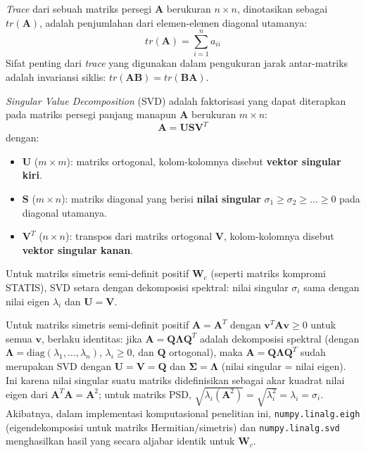 \begin{definition}
  \textit{Trace} dari sebuah matriks persegi $\mathbf{A}$ berukuran $n \times n$, dinotasikan sebagai $tr(\mathbf{A})$, adalah penjumlahan dari elemen-elemen diagonal utamanya:
  \begin{equation}
    tr(\mathbf{A}) = \sum_{i=1}^{n} a_{ii}
  \end{equation}
  Sifat penting dari \textit{trace} yang digunakan dalam pengukuran jarak antar-matriks adalah invariansi siklis: $tr(\mathbf{AB}) = tr(\mathbf{BA})$.
\end{definition}

\begin{definition}
  \textit{Singular Value Decomposition} (SVD) adalah faktorisasi yang dapat diterapkan pada matriks persegi panjang manapun $\mathbf{A}$ berukuran $m \times n$:
  \begin{equation}
    \mathbf{A} = \mathbf{U} \mathbf{S} \mathbf{V}^T
  \end{equation}
  dengan:
  \begin{itemize}
    \item $\mathbf{U}$ ($m \times m$): matriks ortogonal, kolom-kolomnya disebut \textbf{vektor singular kiri}.
    \item $\mathbf{S}$ ($m \times n$): matriks diagonal yang berisi \textbf{nilai singular} $\sigma_1 \ge \sigma_2 \ge \dots \ge 0$ pada diagonal utamanya.
    \item $\mathbf{V}^T$ ($n \times n$): transpos dari matriks ortogonal $\mathbf{V}$, kolom-kolomnya disebut \textbf{vektor singular kanan}.
  \end{itemize}
  Untuk matriks simetris semi-definit positif $\mathbf{W}_c$ (seperti matriks kompromi STATIS), SVD setara dengan dekomposisi spektral: nilai singular $\sigma_i$ sama dengan nilai eigen $\lambda_i$ dan $\mathbf{U} = \mathbf{V}$.
\end{definition}

\begin{remark}
  Untuk matriks simetris semi-definit positif $\mathbf{A} = \mathbf{A}^T$ dengan $\mathbf{v}^T\mathbf{A}\mathbf{v} \ge 0$ untuk semua $\mathbf{v}$, berlaku identitas: jika $\mathbf{A} = \mathbf{Q}\boldsymbol{\Lambda}\mathbf{Q}^T$ adalah dekomposisi spektral (dengan $\boldsymbol{\Lambda} = \mathrm{diag}(\lambda_1,\ldots,\lambda_n)$, $\lambda_i \ge 0$, dan $\mathbf{Q}$ ortogonal), maka $\mathbf{A} = \mathbf{Q}\boldsymbol{\Lambda}\mathbf{Q}^T$ sudah merupakan SVD dengan $\mathbf{U} = \mathbf{V} = \mathbf{Q}$ dan $\mathbf{\Sigma} = \boldsymbol{\Lambda}$ (nilai singular = nilai eigen). Ini karena nilai singular suatu matriks didefinisikan sebagai akar kuadrat nilai eigen dari $\mathbf{A}^T\mathbf{A} = \mathbf{A}^2$; untuk matriks PSD, $\sqrt{\lambda_i(\mathbf{A}^2)} = \sqrt{\lambda_i^2} = \lambda_i = \sigma_i$. Akibatnya, dalam implementasi komputasional penelitian ini, \texttt{numpy.\allowbreak{}linalg.\allowbreak{}eigh} (eigendekomposisi untuk matriks Hermitian/simetris) dan \texttt{numpy.\allowbreak{}linalg.\allowbreak{}svd} menghasilkan hasil yang secara aljabar identik untuk $\mathbf{W}_c$.
\end{remark}

